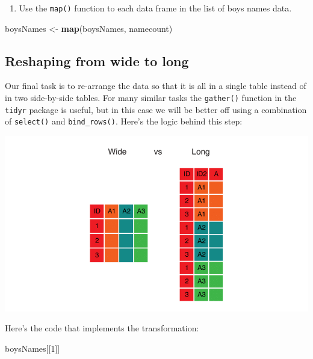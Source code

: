\documentclass[]{book}
\newenvironment{Shaded}{\begin{snugshade}}{\end{snugshade}}
\newcommand{\DecValTok}[1]{\textcolor[rgb]{0.00,0.00,0.81}{#1}}
\newcommand{\KeywordTok}[1]{\textcolor[rgb]{0.13,0.29,0.53}{\textbf{#1}}}
\newcommand{\NormalTok}[1]{#1}
\newcommand{\StringTok}[1]{\textcolor[rgb]{0.31,0.60,0.02}{#1}}
\providecommand{\tightlist}{%
  \setlength{\itemsep}{0pt}\setlength{\parskip}{0pt}}
\begin{document}
\begin{enumerate}
\def\labelenumi{\arabic{enumi}.}
\setcounter{enumi}{2}
\tightlist
\item
  Use the \texttt{map()} function to each data frame in the list of boys names data.
\end{enumerate}

\begin{Shaded}
\begin{Highlighting}[]
\NormalTok{  boysNames <-}\StringTok{ }\KeywordTok{map}\NormalTok{(boysNames, namecount)}
\end{Highlighting}
\end{Shaded}

\hypertarget{reshaping-from-wide-to-long}{%
\subsection{Reshaping from wide to long}\label{reshaping-from-wide-to-long}}

Our final task is to re-arrange the data so that it is all in a single
table instead of in two side-by-side tables. For many similar tasks
the \texttt{gather()} function in the \texttt{tidyr} package is useful, but in this
case we will be better off using a combination of \texttt{select()} and
\texttt{bind\_rows()}. Here's the logic behind this step:

\includegraphics{R/RDataWrangling/images/wide_vs_long.png}

Here's the code that implements the transformation:

\begin{Shaded}
\begin{Highlighting}[]
\NormalTok{boysNames[[}\DecValTok{1}\NormalTok{]]}
\end{Highlighting}
\end{Shaded}
\end{document}
